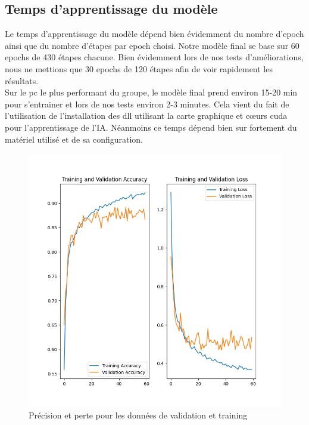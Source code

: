 \documentclass[12pt ,a4paper ]{article}
\begin{document}
\begin{multicols}{2}
\subsection{Temps d'apprentissage du modèle}
Le temps d'apprentissage du modèle dépend bien évidemment du nombre d'epoch ainsi que du nombre d'étapes par epoch choisi. Notre modèle final se base sur 60 epochs de 430 étapes chacune. Bien évidemment lors de nos tests d'améliorations, nous ne mettions que 30 epochs de 120 étapes afin de voir rapidement les résultats. \\

Sur le pc le plus performant du groupe, le modèle final prend environ 15-20 min pour s'entrainer et lors de nos tests environ 2-3 minutes. Cela vient du fait de l'utilisation de l'installation des dll utilisant la carte graphique et cœurs cuda pour l'apprentissage de l'IA. Néanmoins ce temps dépend bien sur fortement du matériel utilisé et de sa configuration.  


\begin{figure}[t]
    \begin{center}
        \includegraphics[scale=0.5]{./img/final.png}
    \end{center}
    \caption{Précision et perte pour les données de validation et training}
\end{figure}
\newpage

\end{multicols}
\end{document}
